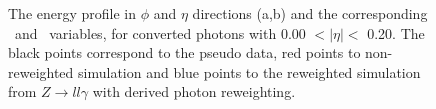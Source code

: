 \begin{figure}[htbp]
	\begin{tcolorbox}[colback=black!5!white,colframe=white!75!black]
    \caption{The energy profile in $\phi$ and $\eta$ directions (a,b) and the corresponding \Rphi \ and \Reta \ variables, for converted photons with 0.00 $ < |\eta| < $ 0.20. The black points correspond to the pseudo data, red points to non-reweighted simulation and blue points to the reweighted simulation from $Z\rightarrow ll\gamma$ with derived photon reweighting.}
    \label{Photon:3}
    \end{tcolorbox}
    
\end{figure}

\begin{figure}[htbp]
    \centering
	 \\

\end{figure}
